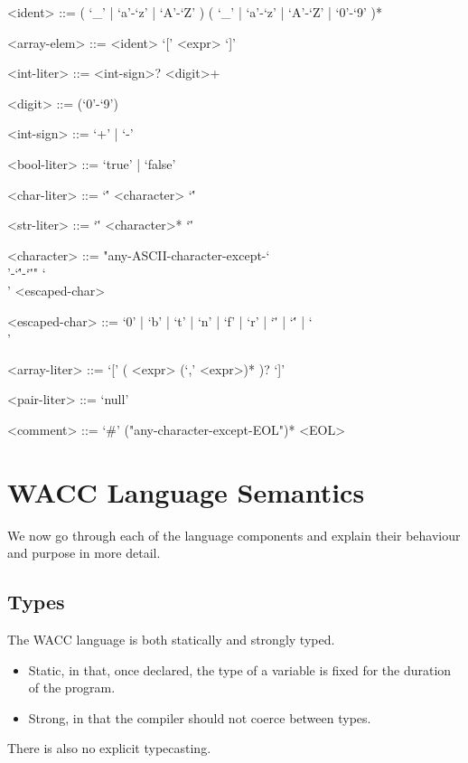 \documentclass[a4paper]{article}
\theoremstyle{definition}
\begin{document}
\begin{grammar}
  <ident> ::= ( `\_' | `a'-`z' | `A'-`Z' ) ( `\_' | `a'-`z' | `A'-`Z' | `0'-`9' )*      
  
  <array-elem> ::= <ident> `[' <expr> `]' 
  
  <int-liter> ::= <int-sign>? <digit>+ 

  <digit> ::= (`0'-`9')
  
  <int-sign> ::= `+' | `-'  
  
  <bool-liter> ::= `true' | `false'
  
  <char-liter> ::= `\'' <character> `\''  

  <str-liter> ::= `\"' <character>* `\"'  
  
  <character> ::= "any-ASCII-character-except-`\\'-`\''-`\"'" 
    \alt `\\' <escaped-char>   

  <escaped-char> ::= `0' | `b' | `t' | `n' | `f' | `r' | `\"' | `\'' | `\\'

  <array-liter> ::= `[' ( <expr> (`,' <expr>)* )? `]' 

  <pair-liter> ::= `null'
    
  <comment> ::= `#' ("any-character-except-EOL")* <EOL>  
\end{grammar}


\section{WACC Language Semantics}
We now go through each of the language components and explain their behaviour and purpose in more detail.

\subsection{Types}
The WACC language is both statically and strongly typed.
\begin{itemize}
  \item Static, in that, once declared, the type of a variable is fixed for the duration of the program. 
  \item Strong, in that the compiler should not coerce between types.
\end{itemize}
There is also no explicit typecasting.
\end{document}
